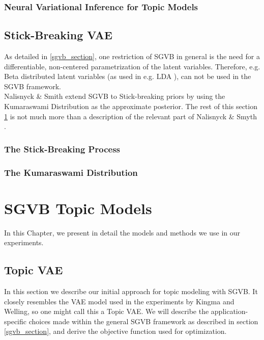 \documentclass{report}
\begin{document}
\subsection{Neural Variational Inference for Topic Models}

\section{Stick-Breaking VAE}\label{sbvae_section}
	As detailed in \ref{sgvb_section}, one restriction of SGVB in general is the need for a differentiable, non-centered parametrization of the latent variables. Therefore, e.g. Beta distributed latent variables (as used in e.g. LDA \cite{bleil2003latent}), can not be used in the SGVB framework. \\ Nalisnyck \& Smith extend SGVB to Stick-breaking priors by using the Kumaraswami Distribution as the approximate posterior. The rest of this section \ref{sbvae_section} is not much more than a description of the relevant part of Nalisnyck \& Smyth \cite{nalisnick2016deep}.
	
	
	\subsection{The Stick-Breaking Process}\label{sb_process}
	
	\subsection{The Kumaraswami Distribution}\label{kum}
	

\chapter{SGVB Topic Models}
In this Chapter, we present in detail the models and methods we use in our experiments. 

\section{Topic VAE}\label{TopicVAE}

In this section we describe our initial approach for topic modeling with SGVB. It closely resembles the VAE model used in the experiments by Kingma and Welling\cite{kingma2013auto}, so one might call this a Topic VAE. We will describe the application-specific choices made within the general SGVB framework as described in section \ref{sgvb_section}, and derive the objective function used for optimization. 
\end{document}
